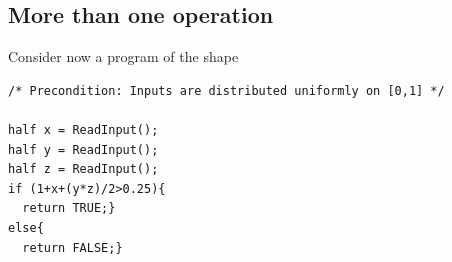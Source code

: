 \documentclass[10pt,a4paper]{article}
\theoremstyle{plain}
\theoremstyle{definition}
\newtheorem{remark}[theorem]{Remark}
\newcommand{\ceil}[1]{\lceil #1 \rceil}
\newcommand{\floor}[1]{\lfloor #1 \rfloor}
\newcommand{\Pro}[1]{\mathbb{P}\left[ #1 \right]}
\begin{document}
%
%
\subsection*{More than one operation}

Consider now a program of the shape
\begin{lstlisting}
/* Precondition: Inputs are distributed uniformly on [0,1] */

half x = ReadInput();
half y = ReadInput();
half z = ReadInput();
if (1+x+(y*z)/2>0.25){
  return TRUE;}
else{
  return FALSE;} 
\end{lstlisting}
\end{document}
